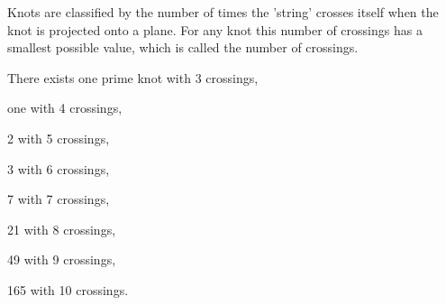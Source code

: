  Knots are classified by the number of times the 'string' crosses
itself when the knot is projected onto a plane. For any knot
this number of crossings has a smallest possible value, which
is called the number of crossings.
\par
There exists one prime knot with 3 crossings,
\par
one with 4 crossings,
\par
2  with 5 crossings,
\par
3  with 6 crossings,
\par
7  with 7 crossings,
\par
21  with 8 crossings,
\par
49  with 9 crossings,
\par
165  with 10 crossings.
